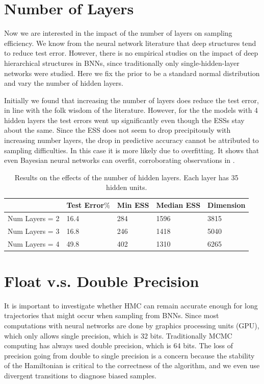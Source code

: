 \documentclass[12pt]{report}
\begin{document}
\section{Number of Layers}
Now we are interested in the impact of the number of layers on sampling efficiency. We know from the neural network literature that deep structures tend to reduce test error. However, there is no empirical studies on the impact of deep hierarchical structures in BNNs, since traditionally only single-hidden-layer networks were studied.
Here we fix the prior to be a standard normal distribution and vary the number of hidden layers.

Initially we found that increasing the number of layers does reduce the test error, in line with the folk wisdom of the literature. However, for the the models with 4 hidden layers the test errors went up significantly even though the ESSs stay about the same. Since the ESS does not seem to drop precipitously with increasing number layers, the drop in predictive accuracy cannot be attributed to sampling difficulties. In this case it is more likely due to overfitting. It shows that even Bayesian neural networks can overfit, corroborating observations in \cite{gal2015bayesian}.



\begin{table}[]
\centering
\begin{tabular}{@{}lllll@{}}
\toprule
            & Test Error$\%$ & Min ESS & Median ESS & Dimension \\ \midrule
Num Layers = 2 & 16.4    & 284 & 1596       & 3815        \\ \midrule
Num Layers = 3  & 16.8  & 246 & 1418     & 5040        \\ \midrule
Num Layers = 4  & 49.8  & 402 & 1310    & 6265        \\ \bottomrule
\end{tabular}
\caption{Results on the effects of the number of hidden layers. Each layer has 35 hidden units.}
\label{my-label}
\end{table}

\section{Float v.s. Double Precision}
It is important to investigate whether HMC can remain accurate enough for long trajectories that might occur when sampling from BNNs. Since most computations with neural networks are done by graphics processing units (GPU), which only allows single precision, which is 32 bits. Traditionally MCMC computing has always used double precision, which is 64 bits. The loss of precision going from double to single precision is a concern because the stability of the Hamiltonian is critical to the correctness of the algorithm, and we even use divergent transitions to diagnose biased samples. 
\end{document}
